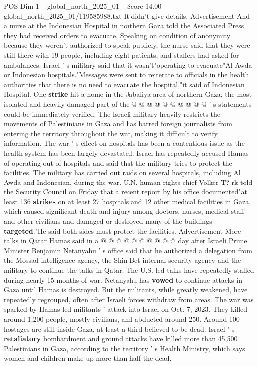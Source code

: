 \begin{textsample}{POS Dim 1 – global\_north\_2025\_01 – Score 14.00 – global\_north\_2025\_01/119585988.txt}
It didn't give details.
Advertisement And a nurse at the Indonesian Hospital in northern Gaza told the Associated Press they had received orders to evacuate.
Speaking on condition of anonymity because they weren't authorized to speak publicly, the nurse said that they were still there with 19 people, including eight patients, and staffers had asked for ambulances.
Israel ' s military said that it wasn't"operating to evacuate"Al Awda or Indonesian hospitals."Messages were sent to reiterate to officials in the health authorities that there is no need to evacuate the hospital,"it said of Indonesian Hospital.
One \textbf{strike} hit a home in the Jabaliya area of northern Gaza, the most isolated and heavily damaged part of the @ @ @ @ @ @ @ @ @ @ ' s statements could be immediately verified.
The Israeli military heavily restricts the movements of Palestinians in Gaza and has barred foreign journalists from entering the territory throughout the war, making it difficult to verify information.
The war ' s effect on hospitals has been a contentious issue as the health system has been largely devastated.
Israel has repeatedly accused Hamas of operating out of hospitals and said that the military tries to protect the facilities.
The military has carried out raids on several hospitals, including Al Awda and Indonesian, during the war.
U.N. human rights chief Volker T? rk told the Security Council on Friday that a recent report by his office documented"at least 136 \textbf{strikes} on at least 27 hospitals and 12 other medical facilities in Gaza, which caused significant death and injury among doctors, nurses, medical staff and other civilians and damaged or destroyed many of the buildings \textbf{targeted}."He said both sides must protect the facilities.
Advertisement More talks in Qatar Hamas said in a @ @ @ @ @ @ @ @ @ @ day after Israeli Prime Minister Benjamin Netanyahu ' s office said that he authorized a delegation from the Mossad intelligence agency, the Shin Bet internal security agency and the military to continue the talks in Qatar.
The U.S.-led talks have repeatedly stalled during nearly 15 months of war.
Netanyahu has \textbf{vowed} to continue attacks in Gaza until Hamas is destroyed.
But the militants, while greatly weakened, have repeatedly regrouped, often after Israeli forces withdraw from areas.
The war was sparked by Hamas-led militants ' attack into Israel on Oct. 7, 2023.
They killed around 1,200 people, mostly civilians, and abducted around 250.
Around 100 hostages are still inside Gaza, at least a third believed to be dead.
Israel ' s \textbf{retaliatory} bombardment and ground attacks have killed more than 45,500 Palestinians in Gaza, according to the territory ' s Health Ministry, which says women and children make up more than half the dead.

\end{textsample}
